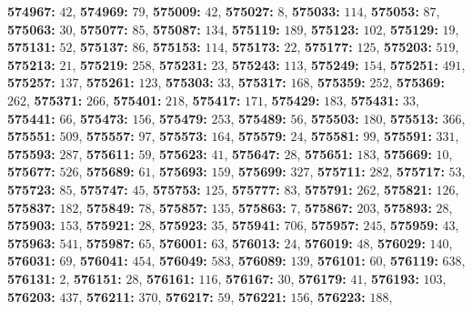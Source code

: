 \textsf{\bfseries 574967:} $42$, \textsf{\bfseries 574969:} $79$, \textsf{\bfseries 575009:} $42$, \textsf{\bfseries 575027:} $8$, \textsf{\bfseries 575033:} $114$, \textsf{\bfseries 575053:} $87$, \textsf{\bfseries 575063:} $30$, \textsf{\bfseries 575077:} $85$, \textsf{\bfseries 575087:} $134$, \textsf{\bfseries 575119:} $189$, \textsf{\bfseries 575123:} $102$, \textsf{\bfseries 575129:} $19$, \textsf{\bfseries 575131:} $52$, \textsf{\bfseries 575137:} $86$, \textsf{\bfseries 575153:} $114$, \textsf{\bfseries 575173:} $22$, \textsf{\bfseries 575177:} $125$, \textsf{\bfseries 575203:} $519$, \textsf{\bfseries 575213:} $21$, \textsf{\bfseries 575219:} $258$, \textsf{\bfseries 575231:} $23$, \textsf{\bfseries 575243:} $113$, \textsf{\bfseries 575249:} $154$, \textsf{\bfseries 575251:} $491$, \textsf{\bfseries 575257:} $137$, \textsf{\bfseries 575261:} $123$, \textsf{\bfseries 575303:} $33$, \textsf{\bfseries 575317:} $168$, \textsf{\bfseries 575359:} $252$, \textsf{\bfseries 575369:} $262$, \textsf{\bfseries 575371:} $266$, \textsf{\bfseries 575401:} $218$, \textsf{\bfseries 575417:} $171$, \textsf{\bfseries 575429:} $183$, \textsf{\bfseries 575431:} $33$, \textsf{\bfseries 575441:} $66$, \textsf{\bfseries 575473:} $156$, \textsf{\bfseries 575479:} $253$, \textsf{\bfseries 575489:} $56$, \textsf{\bfseries 575503:} $180$, \textsf{\bfseries 575513:} $366$, \textsf{\bfseries 575551:} $509$, \textsf{\bfseries 575557:} $97$, \textsf{\bfseries 575573:} $164$, \textsf{\bfseries 575579:} $24$, \textsf{\bfseries 575581:} $99$, \textsf{\bfseries 575591:} $331$, \textsf{\bfseries 575593:} $287$, \textsf{\bfseries 575611:} $59$, \textsf{\bfseries 575623:} $41$, \textsf{\bfseries 575647:} $28$, \textsf{\bfseries 575651:} $183$, \textsf{\bfseries 575669:} $10$, \textsf{\bfseries 575677:} $526$, \textsf{\bfseries 575689:} $61$, \textsf{\bfseries 575693:} $159$, \textsf{\bfseries 575699:} $327$, \textsf{\bfseries 575711:} $282$, \textsf{\bfseries 575717:} $53$, \textsf{\bfseries 575723:} $85$, \textsf{\bfseries 575747:} $45$, \textsf{\bfseries 575753:} $125$, \textsf{\bfseries 575777:} $83$, \textsf{\bfseries 575791:} $262$, \textsf{\bfseries 575821:} $126$, \textsf{\bfseries 575837:} $182$, \textsf{\bfseries 575849:} $78$, \textsf{\bfseries 575857:} $135$, \textsf{\bfseries 575863:} $7$, \textsf{\bfseries 575867:} $203$, \textsf{\bfseries 575893:} $28$, \textsf{\bfseries 575903:} $153$, \textsf{\bfseries 575921:} $28$, \textsf{\bfseries 575923:} $35$, \textsf{\bfseries 575941:} $706$, \textsf{\bfseries 575957:} $245$, \textsf{\bfseries 575959:} $43$, \textsf{\bfseries 575963:} $541$, \textsf{\bfseries 575987:} $65$, \textsf{\bfseries 576001:} $63$, \textsf{\bfseries 576013:} $24$, \textsf{\bfseries 576019:} $48$, \textsf{\bfseries 576029:} $140$, \textsf{\bfseries 576031:} $69$, \textsf{\bfseries 576041:} $454$, \textsf{\bfseries 576049:} $583$, \textsf{\bfseries 576089:} $139$, \textsf{\bfseries 576101:} $60$, \textsf{\bfseries 576119:} $638$, \textsf{\bfseries 576131:} $2$, \textsf{\bfseries 576151:} $28$, \textsf{\bfseries 576161:} $116$, \textsf{\bfseries 576167:} $30$, \textsf{\bfseries 576179:} $41$, \textsf{\bfseries 576193:} $103$, \textsf{\bfseries 576203:} $437$, \textsf{\bfseries 576211:} $370$, \textsf{\bfseries 576217:} $59$, \textsf{\bfseries 576221:} $156$, \textsf{\bfseries 576223:} $188$, 
